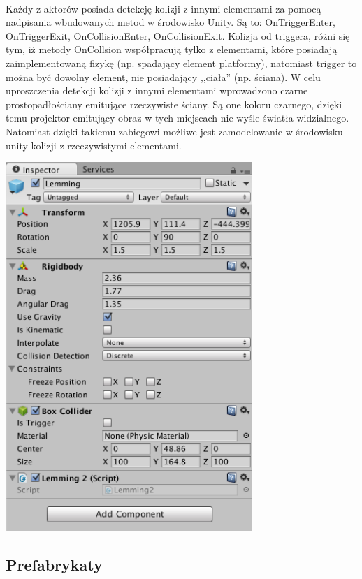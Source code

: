 \paragraph{}
Każdy z aktorów posiada detekcję kolizji z innymi elementami za pomocą nadpisania wbudowanych metod w środowisko Unity. Są to: OnTriggerEnter, OnTriggerExit, OnCollisionEnter, OnCollisionExit. Kolizja od triggera, różni się tym, iż metody OnCollsion współpracują tylko z elementami, które posiadają zaimplementowaną fizykę (np. spadający element platformy), natomiast trigger to można być dowolny element, nie posiadający ,,ciała'' (np. ściana).
\newline
W celu uproszczenia detekcji kolizji z innymi elementami wprowadzono czarne prostopadłościany emitujące rzeczywiste ściany. Są one koloru czarnego, dzięki temu projektor emitujący obraz w tych miejscach nie wyśle światła widzialnego. Natomiast dzięki takiemu zabiegowi możliwe jest zamodelowanie w środowisku unity kolizji z rzeczywistymi elementami.

\begin{center}
\includegraphics[width=0.7\textwidth]{images/aktor.png}
\end{center}

\subsection{Prefabrykaty}
